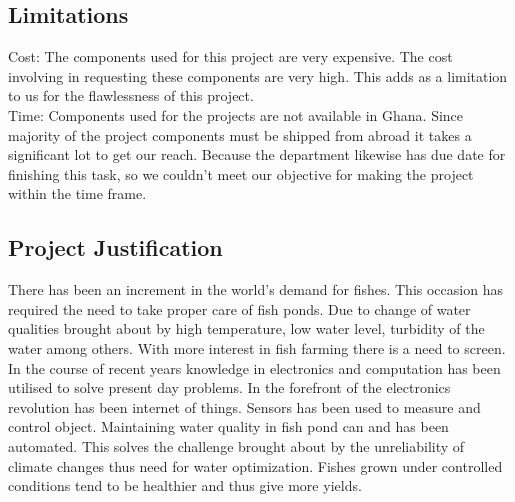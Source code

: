 \documentclass[12pt]{article}
\begin{document}
	\subsection*{Limitations}
	Cost: The components used for this project are very expensive. The cost involving in requesting these components are very high. This adds as a limitation to us for the flawlessness of this project.\\
Time: Components used for the projects are not available in Ghana. Since majority of the project components must be shipped from abroad it takes a significant lot to get our reach. Because the department likewise has due date for finishing this task, so we couldn't meet our objective for making the project within the time frame.

\subsection*{Project Justification}
There has been an increment in the world’s demand for fishes. This occasion has required the need to take proper care of fish ponds. Due to change of water qualities brought about by high temperature, low water level, turbidity of the water among others. With more interest in fish farming there is a need to screen.\\

In the course of recent years knowledge in electronics and computation has been utilised to solve present day problems. In the forefront of the electronics revolution has been internet of things. Sensors has been used to measure and control object. Maintaining water quality in fish pond can and has been automated. This solves the challenge brought about by the unreliability of climate changes thus need for water optimization. Fishes grown under controlled conditions tend to be healthier and thus give more yields. 
\end{document}
